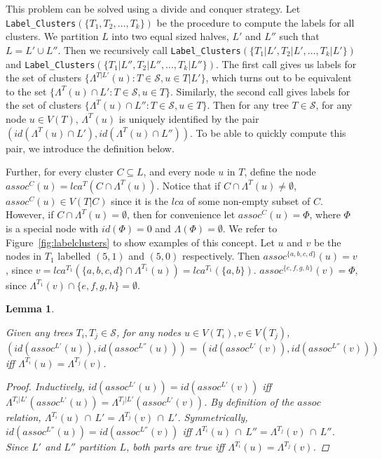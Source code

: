 \documentclass{article}
\newcommand{\leafset}{\Lambda}
\newtheorem{labelclusterscorrectness}[incompatibility]{Lemma}
\begin{document}
    This problem can be solved using a divide and conquer strategy. Let \texttt{Label\_Clusters}$(\{T_1, T_2, \dots, T_k\})$ be the procedure to compute the labels for all clusters. We partition $L$ into two equal sized halves, $L'$ and $L''$ such that $L = L' \cup L''$. Then we recursively call \texttt{Label\_Clusters}$(\{T_1|L', T_2|L', \dots, T_k|L'\})$ and \texttt{Label\_Clusters}$(\{T_1|L'', T_2|L'', \dots, T_k|L''\})$. The first call gives us labels for the set of clusters $\{\leafset^{T|L'}(u) : T \in \mathcal{S}, u \in T|L'\}$, which turns out to be equivalent to the set $\{\leafset^{T}(u) \cap L' : T \in \mathcal{S}, u \in T\}$. Similarly, the second call gives labels for the set of clusters $\{\leafset^{T}(u) \cap L'' : T \in \mathcal{S}, u \in T\}$. Then for any tree $T \in \mathcal{S}$, for any node $u \in V(T)$, $\leafset^T(u)$ is uniquely identified by the pair $(id(\leafset^T(u) \cap L'), id(\leafset^T(u) \cap L''))$. To be able to quickly compute this pair, we introduce the definition below.

    Further, for every cluster $C \subseteq L$, and every node $u$ in $T$, define the node $assoc^C(u) = lca^T(C \cap \leafset^T(u))$. Notice that if $C \cap \leafset^T(u) \neq \emptyset$, $assoc^C(u) \in V(T|C)$ since it is the $lca$ of some non-empty subset of $C$. However, if $C \cap \leafset^T(u) = \emptyset$, then for convenience let $assoc^{C}(u) = \Phi$, where $\Phi$ is a special node with $id(\Phi) = 0$ and $\leafset(\Phi) = \emptyset$. We refer to Figure~\ref{fig:labelclusters} to show examples of this concept. Let $u$ and $v$ be the nodes in $T_1$ labelled $(5, 1)$ and $(5, 0)$ respectively. Then $assoc^{\{a, b, c, d\}}(u) = v$, since $v = lca^{T_1}(\{a, b, c, d\} \cap \leafset^{T_1}(u)) = lca^{T_1}(\{a, b\})$. $assoc^{\{e, f, g, h\}}(v) = \Phi$, since $\leafset^{T_1}(v) \cap \{e, f, g, h\} = \emptyset$.
    \newline

    \begin{labelclusterscorrectness}
        \label{lem:labelclusterscorrectness}

        Given any trees $T_i, T_j \in \mathcal{S}$, for any nodes $u \in V(T_i), v \in V(T_j)$, $(id(assoc^{L'}(u)), id(assoc^{L''}(u))) = (id(assoc^{L'}(v)), id(assoc^{L''}(v)))$ iff $\leafset^{T_i}(u) = \leafset^{T_j}(v)$.

        \begin{proof}
            Inductively, $id(assoc^{L'}(u)) = id(assoc^{L'}(v))$ iff $\leafset^{T_i|L'}(assoc^{L'}(u)) = \leafset^{T_j|L'}(assoc^{L'}(v))$. By definition of the $assoc$ relation, $\leafset^{T_i}(u)\, \cap\, L' = \leafset^{T_j}(v)\, \cap\, L'$. Symmetrically, $id(assoc^{L''}(u)) = id(assoc^{L''}(v))$ iff $\leafset^{T_i}(u)\, \cap\, L'' = \leafset^{T_j}(v)\, \cap\, L''$. Since $L'$ and $L''$ partition $L$, both parts are true iff $\leafset^{T_i}(u) = \leafset^{T_j}(v)$.
        \end{proof}
    \end{labelclusterscorrectness}
\end{document}
